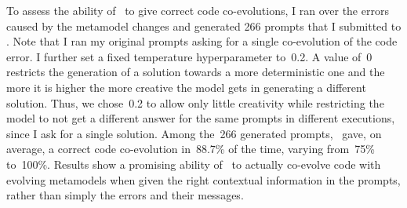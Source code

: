 To assess the ability of \LLM~to give correct code co-evolutions, %
I ran over the errors caused by the metamodel changes and generated 266 prompts that I submitted to \LLM. 
Note that I ran my original prompts asking for a single co-evolution of the code error. I further set a fixed temperature hyperparameter to~0.2. A value of~0 restricts the generation of a solution towards a more deterministic one and the more it is higher the more creative the model gets in generating a different solution. Thus, we chose~0.2 to allow only little creativity while restricting the model to not get a different answer for the same prompts in different executions, since I ask for a single solution. 
%
Among the~266 generated prompts, \LLM~gave, on average, a correct code co-evolution in~88.7\% of the time, varying from~75\% to~100\%. 
Results show a promising ability of \LLM~to actually co-evolve code with evolving metamodels when given the right contextual information in the prompts, rather than simply the errors and their messages. 



